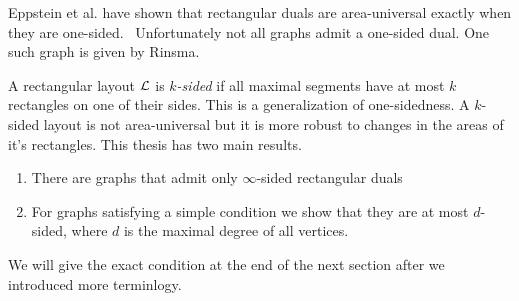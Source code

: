Eppstein et al. have shown that rectangular duals are area-universal exactly when they are one-sided.~\cite{Eppstein2012} Unfortunately not all graphs admit a one-sided dual. One such graph is given by Rinsma.~\cite{Rinsma1987}

A rectangular layout $\mathcal{L}$ is \emph{$k$-sided} if all maximal segments have at most $k$ rectangles on one of their sides. This is a generalization of one-sidedness. A $k$-sided layout is not area-universal but it is more robust to changes in the areas of it's rectangles.  This thesis has two main results.

\begin{enumerate}
  \item There are graphs that admit only $\infty$-sided rectangular duals
  \item For graphs satisfying a simple condition we show that they are at most $d$-sided, where $d$ is the maximal degree of all vertices.
\end{enumerate}

We will give the exact condition at the end of the next section after we introduced more terminlogy.

